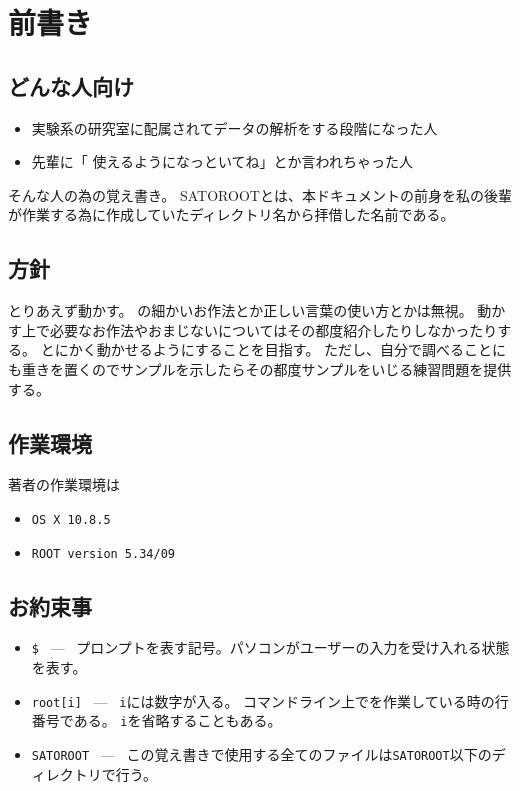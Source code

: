 \clearpage
\setcounter{section}{-1} %
 \section{前書き}


  \subsection{どんな人向け}
  \begin{itemize}
   \item 実験系の研究室に配属されてデータの解析をする段階になった人
   \item 先輩に「 \ROOT 使えるようになっといてね」とか言われちゃった人
  \end{itemize}
  そんな人の為の覚え書き。
  SATOROOTとは、本ドキュメントの前身を私の後輩が作業する為に作成していたディレクトリ名から拝借した名前である。


  \subsection{方針}
  とりあえず動かす。
  \Cpp の細かいお作法とか正しい言葉の使い方とかは無視。
  動かす上で必要なお作法やおまじないについてはその都度紹介したりしなかったりする。
  とにかく動かせるようにすることを目指す。
  ただし、自分で調べることにも重きを置くのでサンプルを示したらその都度サンプルをいじる練習問題を提供する。


  \subsection{作業環境}
  著者の作業環境は
  \begin{itemize}
   \item 
	 \verb|OS X 10.8.5|
   \item 
	 \verb|ROOT version 5.34/09|
  \end{itemize}


  \subsection{お約束事}
  \begin{itemize}
   \item \verb|$| \ --- \ プロンプトを表す記号。パソコンがユーザーの入力を受け入れる状態を表す。
   \item \verb|root[i]| \ --- \ \verb|i|には数字が入る。
	 コマンドライン上で\ROOT を作業している時の行番号である。
	 \verb|i|を省略することもある。
   \item \verb|SATOROOT| \ --- \ この覚え書きで使用する全てのファイルは\verb|SATOROOT|以下のディレクトリで行う。
  \end{itemize}